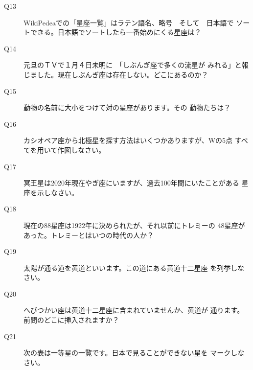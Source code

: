 \documentclass[fleqn]{article}
\begin{document}
\begin{description}
\item[Q13]{WikiPedeaでの「星座一覧」はラテン語名、略号　そして　日本語で
ソートできる。日本語でソートしたら一番始めにくる星座は？
}
\item[Q14]{元旦のＴＶで１月４日未明に　「しぶんぎ座で多くの流星が
みれる」と報じました。現在しぶんぎ座は存在しない。どこにあるのか？
}
\item[Q15]{動物の名前に大小をつけて対の星座があります。その
動物たちは？
}

\item[Q16]{カシオペア座から北極星を探す方法はいくつかありますが、Wの5点
すべてを用いて作図しなさい。
}
\item[Q17]{冥王星は2020年現在やぎ座にいますが、過去100年間にいたことがある
星座を示しなさい。
}

\item[Q18]{現在の88星座は1922年に決められたが、それ以前にトレミーの
48星座があった。トレミーとはいつの時代の人か？
}
\item[Q19]{太陽が通る道を黄道といいます。この道にある黄道十二星座
を列挙しなさい。
}

\item[Q20]{へびつかい座は黄道十二星座に含まれていませんか、黄道が
通ります。前問のどこに挿入されますか？
}
\item[Q21]{次の表は一等星の一覧です。日本で見ることができない星を
マークしなさい。\\



}
\end{description}
\end{document}
